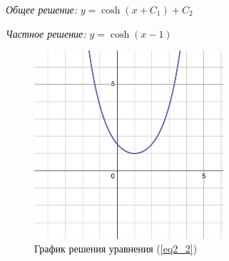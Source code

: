 \begin{enumerate}
                \textit{Общее решение:}
                    \( y = \cosh(x + C_1) + C_2 \)

                \textit{Частное решение:}
                    \( y = \cosh(x - 1) \)

                \begin{figure}[H]
                    \centering
                    \includegraphics[width=7cm]{pics/2_2.pdf}
                    \caption{График решения уравнения (\ref{eq2_2})}
                \end{figure}
        \end{enumerate}